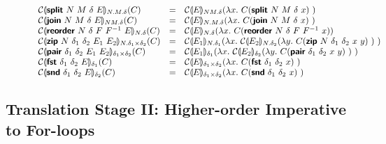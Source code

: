 \begin{figure}[H]
\begin{displaymath}
\begin{array}{lcl}
      \mathcal{C}\llparenthesis \bm{\mathsf{split}}~N~M~\delta~E \rrparenthesis_{N.M.\delta}(C)
      &=& \mathcal{C}\llparenthesis E \rrparenthesis_{NM.\delta}(\lambda x.~C(\bm{\mathsf{split}}~N~M~\delta~x)~)
      \\
      \mathcal{C}\llparenthesis \bm{\mathsf{join}}~N~M~\delta~E \rrparenthesis_{NM.\delta}(C)
      &=& \mathcal{C}\llparenthesis E \rrparenthesis_{N.M.\delta}(\lambda x.~C(\bm{\mathsf{join}}~N~M~\delta~x)~)
      \\
      \mathcal{C}\llparenthesis \bm{\mathsf{reorder}}~N~\delta~F~F^{-1}~E \rrparenthesis_{N.\delta}(C)
      &=& \mathcal{C}\llparenthesis E \rrparenthesis_{N.\delta}(\lambda x.~C(\bm{\mathsf{reorder}}~N~\delta~F~F^{-1}~x))
      \\
      \mathcal{C}\llparenthesis \bm{\mathsf{zip}}~N~\delta_1~\delta_2~E_1~E_2 \rrparenthesis_{N.\delta_1 \times \delta_2}(C)
      &=& \mathcal{C}\llparenthesis E_1 \rrparenthesis_{N.\delta_1}(\lambda x.~\mathcal{C}\llparenthesis E_2 \rrparenthesis_{N.\delta_2}(\lambda y.~C(\bm{\mathsf{zip}}~N~\delta_1~\delta_2~x~y)~)~)
      \\
      \mathcal{C}\llparenthesis \bm{\mathsf{pair}}~\delta_1~\delta_2~E_1~E_2 \rrparenthesis_{\delta_1\times\delta_2}(C)
      &=& \mathcal{C}\llparenthesis E_1 \rrparenthesis_{\delta_1}(\lambda x.~\mathcal{C}\llparenthesis E_2 \rrparenthesis_{\delta_2}(\lambda y.~C(\bm{\mathsf{pair}}~\delta_1~\delta_2~x~y)~)~)
      \\
      \mathcal{C}\llparenthesis \bm{\mathsf{fst}}~\delta_1~\delta_2~E \rrparenthesis_{\delta_1}(C)
      &=& \mathcal{C}\llparenthesis E \rrparenthesis_{\delta_1\times\delta_2}(\lambda x.~C(\bm{\mathsf{fst}}~\delta_1~\delta_2~x)~)
      \\
      \mathcal{C}\llparenthesis \bm{\mathsf{snd}}~\delta_1~\delta_2~E \rrparenthesis_{\delta_2}(C)
      &=& \mathcal{C}\llparenthesis E \rrparenthesis_{\delta_1\times\delta_2}(\lambda x.~C(\bm{\mathsf{snd}}~\delta_1~\delta_2~x)~)
      \\
    \end{array}
  \end{displaymath}
  \label{fig:con-trans}
\end{figure}

\clearpage

\subsection{Translation Stage II: Higher-order Imperative to For-loops}
\label{sec:translation-ii}

\newcommand{\ei}{\prim{idx}~n~\dtone~\mathit{xs}~i}
\newcommand{\ea}{\prim{idxAcc}~n~\dttwo~\mathit{out}~i}

